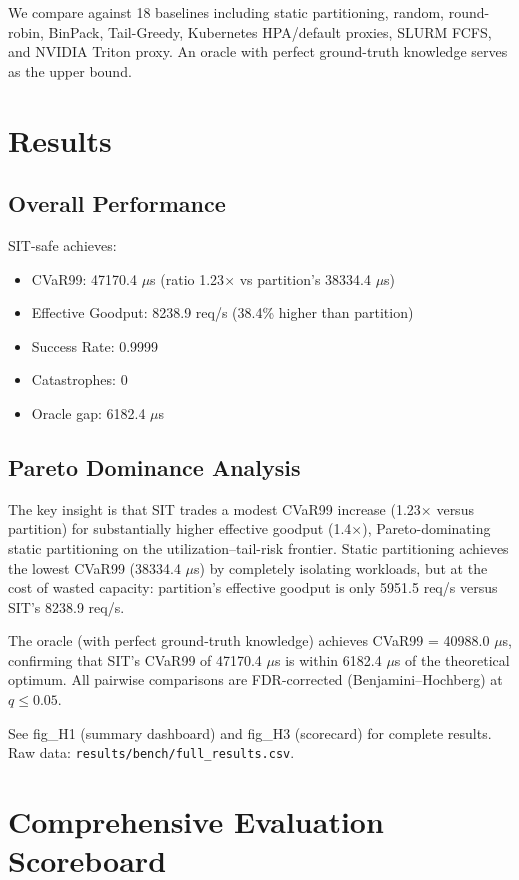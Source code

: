 \documentclass[11pt,twocolumn]{article}
\begin{document}
We compare against 18 baselines including static partitioning, random,
round-robin, BinPack, Tail-Greedy, Kubernetes HPA/default proxies,
SLURM FCFS, and NVIDIA Triton proxy. An oracle with perfect
ground-truth knowledge serves as the upper bound.

\section{Results}
\label{sec:results}

\subsection{Overall Performance}

SIT-safe achieves:
\begin{itemize}
\item CVaR99: 47170.4 $\mu$s (ratio 1.23$\times$ vs partition's 38334.4 $\mu$s)
\item Effective Goodput: 8238.9 req/s (38.4\% higher than partition)
\item Success Rate: 0.9999
\item Catastrophes: 0
\item Oracle gap: 6182.4 $\mu$s
\end{itemize}

\subsection{Pareto Dominance Analysis}

The key insight is that SIT trades a modest CVaR99 increase (1.23$\times$
versus partition) for substantially higher effective goodput (1.4$\times$),
Pareto-dominating static partitioning on the utilization--tail-risk frontier.
Static partitioning achieves the lowest CVaR99 (38334.4 $\mu$s) by
completely isolating workloads, but at the cost of wasted capacity:
partition's effective goodput is only 5951.5 req/s versus
SIT's 8238.9 req/s.

The oracle (with perfect ground-truth knowledge) achieves CVaR99 =
40988.0 $\mu$s, confirming that SIT's CVaR99 of 47170.4 $\mu$s
is within 6182.4 $\mu$s of the theoretical optimum.
All pairwise comparisons are FDR-corrected (Benjamini--Hochberg) at $q \leq 0.05$.

See fig\_H1 (summary dashboard) and fig\_H3 (scorecard) for complete results.
Raw data: \texttt{results/bench/full\_results.csv}.

\section{Comprehensive Evaluation Scoreboard}
\label{sec:scoreboard}
\end{document}
